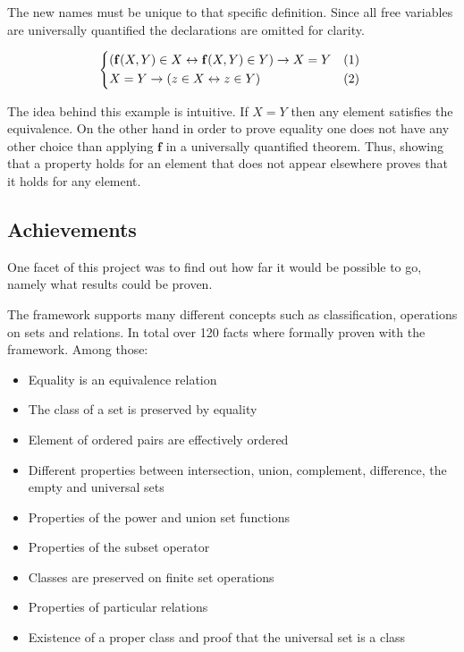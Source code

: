 \documentclass[acmlarge]{acmart}
\begin{document}
The new names must be unique to that specific definition. Since all free variables are universally quantified the declarations are omitted for clarity.

\[
\begin{dcases*}
(\mathbf{f}(X, Y) \in X \leftrightarrow \mathbf{f}(X, Y) \in Y) \rightarrow X = Y & (1) \\
X = Y \rightarrow (z \in X \leftrightarrow z \in Y) & (2)
\end{dcases*}
\]

The idea behind this example is intuitive. If $X = Y$ then any element satisfies the equivalence. On the other hand in order to prove equality one does not have any other choice than applying $\mathbf{f}$ in a universally quantified theorem. Thus, showing that a property holds for an element that does not appear elsewhere proves that it holds for any element.

\subsection{Achievements}

One facet of this project was to find out how far it would be possible to go, namely what results could be proven.

The framework supports many different concepts such as classification, operations on sets and relations. In total over 120 facts where formally proven with the framework. Among those:

\begin{itemize}
  \item Equality is an equivalence relation
  \item The class of a set is preserved by equality
  \item Element of ordered pairs are effectively ordered
  \item Different properties between intersection, union, complement, difference, the empty and universal sets
  \item Properties of the power and union set functions
  \item Properties of the subset operator
  \item Classes are preserved on finite set operations
  \item Properties of particular relations
  \item Existence of a proper class and proof that the universal set is a class
\end{itemize}
\end{document}
